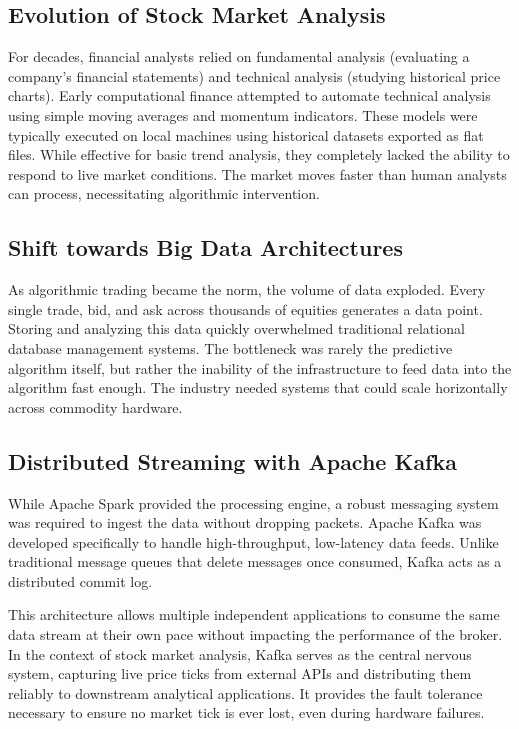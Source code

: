 \documentclass[12pt,a4paper]{report}
\begin{document}
\subsection{Evolution of Stock Market Analysis}

For decades, financial analysts relied on fundamental analysis (evaluating a company's financial statements) and technical analysis (studying historical price charts). Early computational finance attempted to automate technical analysis using simple moving averages and momentum indicators. These models were typically executed on local machines using historical datasets exported as flat files. While effective for basic trend analysis, they completely lacked the ability to respond to live market conditions. The market moves faster than human analysts can process, necessitating algorithmic intervention.

\subsection{Shift towards Big Data Architectures}

As algorithmic trading became the norm, the volume of data exploded. Every single trade, bid, and ask across thousands of equities generates a data point. Storing and analyzing this data quickly overwhelmed traditional relational database management systems. The bottleneck was rarely the predictive algorithm itself, but rather the inability of the infrastructure to feed data into the algorithm fast enough. The industry needed systems that could scale horizontally across commodity hardware. 

\subsection{Distributed Streaming with Apache Kafka}

While Apache Spark provided the processing engine, a robust messaging system was required to ingest the data without dropping packets. Apache Kafka was developed specifically to handle high-throughput, low-latency data feeds. Unlike traditional message queues that delete messages once consumed, Kafka acts as a distributed commit log. 

This architecture allows multiple independent applications to consume the same data stream at their own pace without impacting the performance of the broker. In the context of stock market analysis, Kafka serves as the central nervous system, capturing live price ticks from external APIs and distributing them reliably to downstream analytical applications. It provides the fault tolerance necessary to ensure no market tick is ever lost, even during hardware failures.
\end{document}
